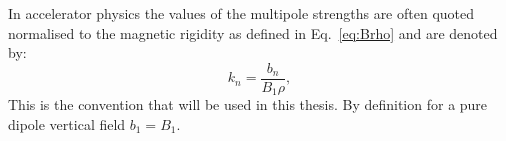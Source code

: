 
In accelerator physics the values of the multipole strengths are often quoted normalised to the magnetic rigidity as defined in Eq.~\eqref{eq:Brho} and are denoted by:
\begin{equation}\label{eq:kn}
    k_n = \frac{b_n}{B_1 \rho},
\end{equation}
This is the convention that will be used in this thesis. %
By definition for a pure dipole vertical field $b_1=B_1$.%




